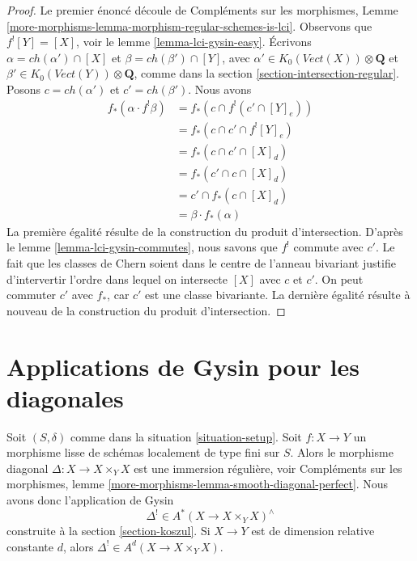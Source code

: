 \begin{proof}
Le premier énoncé découle de
Compléments sur les morphismes, Lemme
\ref{more-morphisms-lemma-morphism-regular-schemes-is-lci}.
Observons que $f^![Y] = [X]$, voir le lemme \ref{lemma-lci-gysin-easy}.
Écrivons $\alpha = ch(\alpha') \cap [X]$ et $\beta = ch(\beta') \cap [Y]$,
avec $\alpha' \in K_0(\textit{Vect}(X)) \otimes \mathbf{Q}$ et
$\beta' \in K_0(\textit{Vect}(Y)) \otimes \mathbf{Q}$,
comme dans la section \ref{section-intersection-regular}.
Posons $c = ch(\alpha')$ et $c' = ch(\beta')$. Nous avons
\begin{align*}
f_*(\alpha \cdot f^!\beta)
& =
f_*(c \cap f^!(c' \cap [Y]_e)) \\
& =
f_*(c \cap c' \cap f^![Y]_e) \\
& =
f_*(c \cap c' \cap [X]_d) \\
& =
f_*(c' \cap c \cap [X]_d) \\
& =
c' \cap f_*(c \cap [X]_d) \\
& =
\beta \cdot f_*(\alpha)
\end{align*}
La première égalité résulte de la construction du produit d'intersection.
D'après le lemme \ref{lemma-lci-gysin-commutes}, nous savons que $f^!$
commute avec $c'$. Le fait que les classes de Chern soient dans le centre
de l'anneau bivariant justifie d'intervertir l'ordre dans lequel on intersecte
$[X]$ avec $c$ et $c'$. On peut commuter $c'$ avec $f_*$, car $c'$
est une classe bivariante. La dernière égalité résulte à nouveau de la construction
du produit d'intersection.
\end{proof}













\section{Applications de Gysin pour les diagonales}
\label{section-gysin-for-diagonal}

\noindent
Soit $(S, \delta)$ comme dans la situation \ref{situation-setup}. Soit $f : X \to Y$
un morphisme lisse de schémas localement de type fini sur $S$. Alors le
morphisme diagonal $\Delta : X \longrightarrow X \times_Y X$
est une immersion régulière, voir
Compléments sur les morphismes, lemme \ref{more-morphisms-lemma-smooth-diagonal-perfect}.
Nous avons donc l'application de Gysin
$$
\Delta^! \in A^*(X \to X \times_Y X)^\wedge
$$
construite à la section \ref{section-koszul}. Si $X \to Y$ est de
dimension relative constante $d$, alors $\Delta^! \in A^d(X \to X \times_Y X)$.

